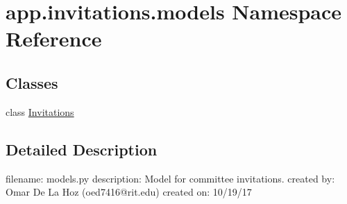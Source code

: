 \hypertarget{namespaceapp_1_1invitations_1_1models}{}\section{app.\+invitations.\+models Namespace Reference}
\label{namespaceapp_1_1invitations_1_1models}
\subsection*{Classes}
\begin{DoxyCompactItemize}
\item 
class \mbox{\hyperlink{classapp_1_1invitations_1_1models_1_1_invitations}{Invitations}}
\end{DoxyCompactItemize}


\subsection{Detailed Description}
\begin{DoxyVerb}filename: models.py
description: Model for committee invitations.
created by: Omar De La Hoz (oed7416@rit.edu)
created on: 10/19/17
\end{DoxyVerb}
 